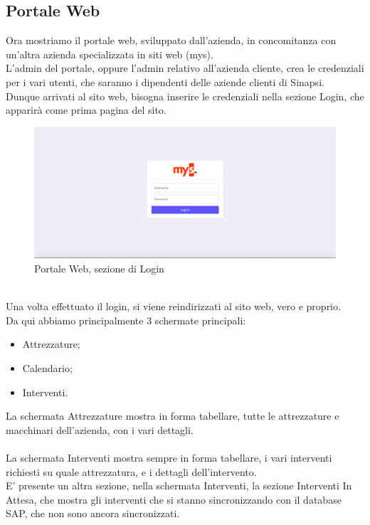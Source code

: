 \subsection{Portale Web}
Ora mostriamo il portale web, sviluppato dall'azienda, in concomitanza con un'altra azienda specializzata in siti web (mys).\\
L'admin del portale, oppure l'admin relativo all'azienda cliente, crea le credenziali per i vari utenti, che saranno i dipendenti delle aziende clienti di Sinapsi.\\
Dunque arrivati al sito web, bisogna inserire le credenziali nella sezione Login, che apparirà come prima pagina del sito.\\
\begin{figure}[!h] 
	\centering 
	\includegraphics[scale = 0.3]{immagini/portale/login.png} 
	\caption {Portale Web, sezione di Login}
\end{figure}
\\Una volta effettuato il login, si viene reindirizzati al sito web, vero e proprio.\\
Da qui abbiamo principalmente 3 schermate principali:
\begin{itemize}
	\item Attrezzature;
	\item Calendario;
	\item Interventi.\\
\end{itemize}
La schermata Attrezzature mostra in forma tabellare, tutte le attrezzature e macchinari dell'azienda, con i vari dettagli.\\\\
La schermata Interventi mostra sempre in forma tabellare, i vari interventi richiesti su quale attrezzatura, e i dettagli dell'intervento.\\
E' presente un altra sezione, nella schermata Interventi, la sezione Interventi In Attesa, che mostra gli interventi che si stanno sincronizzando con il database SAP, che non sono ancora sincronizzati.
\newpage


